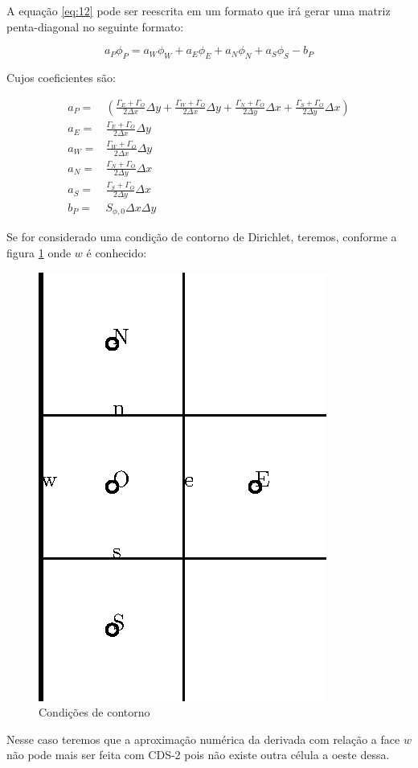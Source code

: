 A equação \ref{eq:12} pode ser reescrita em um formato que irá gerar uma matriz penta-diagonal no seguinte formato:

\begin{equation}
    a_P \phi_P = a_W \phi_W + a_E \phi_E + a_N \phi_N + a_S \phi_S - b_P
\end{equation}

Cujos coeficientes são:

\begin{eqnarray}
    a_P =& \left( \frac{\Gamma_E + \Gamma_O}{2 \Delta x} \Delta y + \frac{\Gamma_W + \Gamma_O}{2 \Delta x} \Delta y + \frac{\Gamma_N + \Gamma_O}{2 \Delta y} \Delta x + \frac{\Gamma_S + \Gamma_O}{2 \Delta y} \Delta x \right)\\
    a_E =& \frac{\Gamma_E + \Gamma_O}{2 \Delta x} \Delta y\\
    a_W =& \frac{\Gamma_W + \Gamma_O}{2 \Delta x} \Delta y\\
    a_N =& \frac{\Gamma_N + \Gamma_O}{2 \Delta y} \Delta x\\
    a_S =& \frac{\Gamma_S + \Gamma_O}{2 \Delta y} \Delta x\\
    b_P =& S_{\phi,0} \Delta x \Delta y
\end{eqnarray}

Se for considerado uma condição de contorno de Dirichlet, teremos, conforme a figura  \ref{fig:fig2} onde $w$ é conhecido:

\begin{figure}[h!]
    \centering
    \includegraphics[width=0.4\linewidth]{fig/figura2.eps}
    \caption{Condições de contorno}
    \label{fig:fig2}
\end{figure}

Nesse caso teremos que a aproximação numérica da derivada com relação a face $w$ não pode mais ser feita com CDS-2 pois não existe outra célula a oeste dessa.

